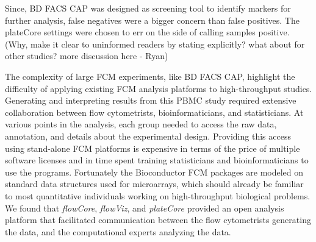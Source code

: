 \documentclass[12pt]{article}
\newcommand{\Rpackage}[1]{{\textit{#1}}}
\begin{document}
Since, BD FACS CAP was designed as screening tool to 
identify markers for further analysis, false negatives were a bigger concern
than false positives. The plateCore settings were chosen to err on the side of
calling samples positive. (Why, make it clear to uninformed readers by stating
explicitly? what about for other studies? more discussion here - Ryan)

The complexity of large FCM experiments, like BD FACS CAP, highlight the 
difficulty of applying existing FCM analysis platforms to high-throughput
studies. Generating and interpreting results from this PBMC study required
extensive collaboration between flow cytometrists, bioinformaticians, and
statisticians. At various points in the analysis, each group needed to access
the raw data, annotation, and details about the experimental design. Providing
this access using stand-alone FCM platforms is expensive in terms of the price
of multiple software licenses and in time spent training statisticians and
bioinformaticians to use the programs. Fortunately the Bioconductor FCM
packages are modeled on standard data structures used for microarrays, which
should already be familiar to most quantitative individuals working on
high-throughput biological problems. We found that \Rpackage{flowCore},
\Rpackage{flowViz}, and \Rpackage{plateCore} provided an open analysis platform
that facilitated communication between the flow cytometrists generating the
data, and the computational experts analyzing the data.


\clearpage

 
\end{document}
